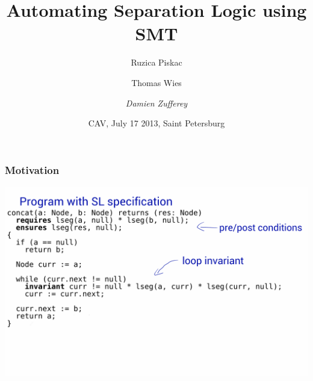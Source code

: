 \documentclass{beamer}
\title[Automating Separation Logic using SMT]{Automating Separation Logic using SMT}
\author[Damien Zufferey]{
  Ruzica Piskac \and
  Thomas Wies \and
  \emph{Damien Zufferey}
}
\institute{ MPI-SWS \hspace{10mm} NYU \hspace{10mm} IST Austria }
\date{CAV, July 17 2013, Saint Petersburg}
\begin{document}
\frame[plain]{\titlepage}

\begin{frame}
  \frametitle{Motivation}
  \includegraphics[scale=0.17]{resources/spec.png}
\end{frame}
\end{document}
